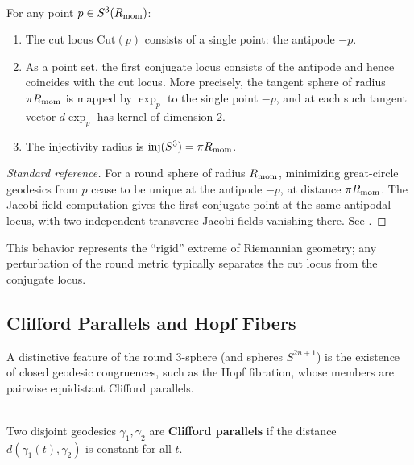 \documentclass[11pt]{article}
\begin{document}
\begin{theorem}
\label{p1a:theorem:atlas-cut-locus-and-conjugate-locus-4ac018a}

\mbox{}\\[6pt] 
For any point $p \in S^3(R_{\mathrm{mom}})$:
\begin{enumerate}
\item The cut locus $\mathrm{Cut}(p)$ consists of a single point: the antipode $-p$.
\item As a point set, the first conjugate locus consists of the antipode and hence coincides with the cut locus. More precisely, the tangent sphere of radius $\pi R_{\mathrm{mom}}$ is mapped by $\exp_p$ to the single point $-p$, and at each such tangent vector $d\exp_p$ has kernel of dimension $2$.
\item The injectivity radius is $\mathrm{inj}(S^3) = \pi R_{\mathrm{mom}}$.
\end{enumerate}
\end{theorem}

\begin{proof}[Standard reference]
For a round sphere of radius \(R_{\mathrm{mom}}\), minimizing great-circle geodesics
from \(p\) cease to be unique at the antipode \(-p\), at distance
\(\pi R_{\mathrm{mom}}\). The Jacobi-field computation gives the first conjugate point
at the same antipodal locus, with two independent transverse Jacobi fields
vanishing there. See \cite{do1992riemannian}.
\end{proof}


This behavior represents the ``rigid'' extreme of Riemannian geometry; any perturbation of the round metric typically separates the cut locus from the conjugate locus.

\subsection{Clifford Parallels and Hopf Fibers}

A distinctive feature of the round $3$-sphere (and spheres $S^{2n+1}$) is the existence of closed geodesic congruences, such as the Hopf fibration, whose members are pairwise equidistant Clifford parallels.

\begin{definition}
\mbox{}\\[6pt] 
Two disjoint geodesics $\gamma_1, \gamma_2$ are \textbf{Clifford parallels} if the distance $d(\gamma_1(t), \gamma_2)$ is constant for all $t$.
\end{definition}
\end{document}
